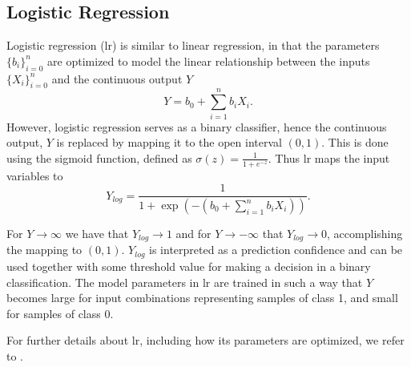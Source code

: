 \subsection{Logistic Regression}
Logistic regression (\gls{lr}) is similar to linear regression, in that the parameters $\{b_i\}_{i=0}^n$ are optimized to model the linear relationship between the inputs $\{X_i\}_{i=0}^n$ and the continuous output $Y$
\begin{equation}
	Y= b_0+\sum_{i=1}^n b_iX_i.
\end{equation}
However, logistic regression serves as a binary classifier, hence the continuous output, $Y$ is replaced by mapping it to the open interval $(0,1)$. This is done using the sigmoid function, defined as $\sigma(z)=\frac{1}{1+e^{-z}}$. Thus \gls{lr} maps the input variables to
\begin{equation}
\label{eq:log_eq}
	Y_{log}= \frac{1}{1+\exp(-(b_0 + \sum_{i=1}^n b_iX_i))}.
\end{equation}

For $Y\rightarrow \infty$ we have that $Y_{log}\rightarrow 1$ and for $Y\rightarrow -\infty$ that $Y_{log}\rightarrow 0$, accomplishing the mapping to $(0,1)$. $Y_{log}$ is interpreted as a prediction confidence and can be used together with some threshold value for making a decision in a binary classification. The model parameters in \gls{lr} are trained in such a way that $Y$ becomes large for input combinations representing samples of class 1, and small for samples of class 0.

For further details about \gls{lr}, including how its parameters are optimized, we refer to \citep{shalev-shwartz_ben-david_2016}.





